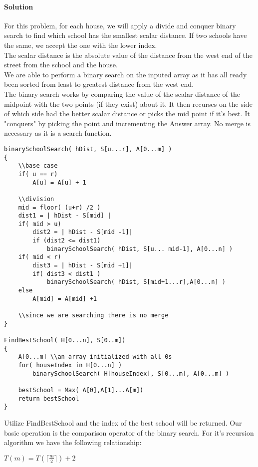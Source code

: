 \documentclass[12pt]{article}
\begin{document}
\paragraph{Solution}
For this problem, for each house, we will apply a divide and conquer binary search to find which school has the smallest scalar distance.  If two schools have the same, we accept the one with the lower index.\\
The scalar distance is the absolute value of the distance from the west end of the street from the school and the house. \\
We are able to perform a binary search on the inputed array as it has all ready been sorted from least to greatest distance from the west end.\\
The binary search works by comparing the value of the scalar distance of the midpoint with the two points (if they exist) about it.  It then recurses on the side of which side had the better
scalar distance or picks the mid point if it's best.  It "conquers" by picking the point and incrementing the Answer array.  No merge is necessary as it is a search function.\\
\begin{lstlisting}
binarySchoolSearch( hDist, S[u...r], A[0...m] )
{
	\\base case
	if( u == r)
		A[u] = A[u] + 1

	\\division
	mid = floor( (u+r) /2 )
	dist1 = | hDist - S[mid] |
	if( mid > u)
		dist2 = | hDist - S[mid -1]|
		if (dist2 <= dist1)
			binarySchoolSearch( hDist, S[u... mid-1], A[0...n] )
	if( mid < r)
		dist3 = | hDist - S[mid +1]|
		if( dist3 < dist1 )
			binarySchoolSearch( hDist, S[mid+1...r],A[0...n] )
	else
		A[mid] = A[mid] +1

	\\since we are searching there is no merge
}

FindBestSchool( H[0...n], S[0..m])
{
	A[0...m] \\an array initialized with all 0s
	for( houseIndex in H[0...n] )
		binarySchoolSearch( H[houseIndex], S[0...m], A[0...m] )

	bestSchool = Max( A[0],A[1]...A[m])
	return bestSchool
}
\end{lstlisting}
Utilize FindBestSchool and the index of the best school will be returned.
Our basic operation is the comparison operator of the binary search.  For it's recursion algorithm we have the following relationship:\\
\centerline{ $T(m) = T(\lceil \frac{m}{2} \rceil ) + 2$}\\
\end{document}

